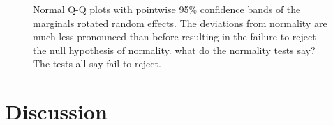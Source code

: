 \documentclass[12pt]{article} %
\newcommand{\hh}[1]{{\color{orange} #1}}
\newcommand{\al}[1]{{\color{red} #1}}
\begin{document}
\begin{figure}[htb]
	\centering
	\caption{\label{fig:rotate-radon} Normal Q-Q plots with pointwise 95\% confidence bands of the marginals rotated random effects. The deviations from normality are much less pronounced than before resulting in the failure to reject the null hypothesis of normality. \hh{what do the normality tests say?} \al{The tests all say fail to reject.}}
\end{figure}


\section{Discussion}\label{sec:discussion}
\end{document}
